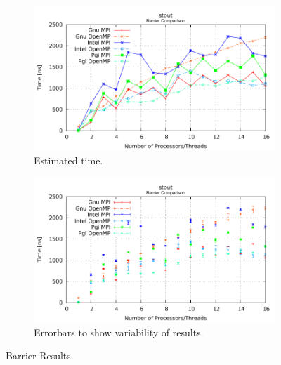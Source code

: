 \begin{figure} [h!]
    \centering
    \captionsetup{justification=centering, singlelinecheck=false}
    \begin{subfigure}{.6\textwidth}
      \centering
      \hspace*{-1.5cm} 
      \includegraphics[width=0.95\linewidth]{Plots/barrier/stout.pdf}
      \caption[]{Estimated time.}
      \label{fig:Barrier}
    \end{subfigure}%
    \begin{subfigure}{.6\textwidth}
      \centering
      \hspace*{-1.5cm} 
      \includegraphics[width=0.95\linewidth]{Plots/barrier/stoutError.pdf}
      \caption{Errorbars to show variability of results.}
      \label{fig:BarrierErrorBars}
    \end{subfigure}
\caption{Barrier Results.}
\label{fig:BarrierAndErrorBars}
\end{figure}





